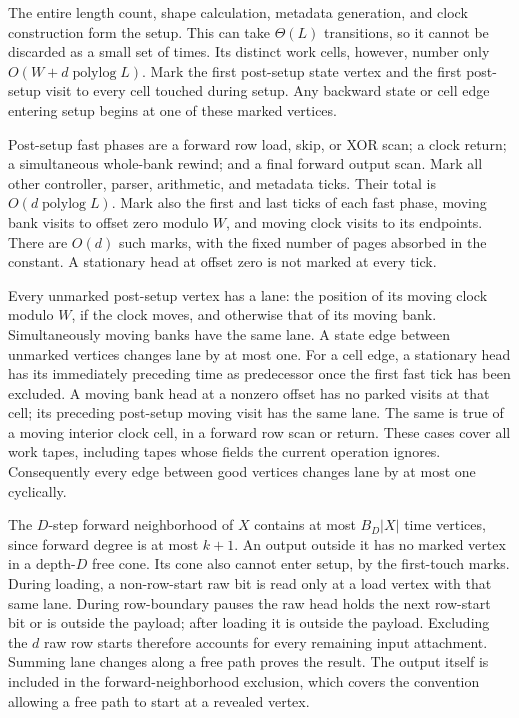 \begin{informalproof}
The entire length count, shape calculation, metadata generation, and clock
construction form the setup.  This can take $\Theta(L)$ transitions, so
it cannot be discarded as a small set of times.  Its distinct work cells,
however, number only $O(W+d\operatorname{polylog}L)$.  Mark the first
post-setup state vertex and the first post-setup visit to every cell touched
during setup.  Any backward state or cell edge entering setup begins at
one of these marked vertices.

Post-setup fast phases are a forward row load, skip, or XOR scan; a clock
return; a simultaneous whole-bank rewind; and a final forward output
scan.  Mark all other controller, parser, arithmetic, and metadata ticks.
Their total is $O(d\operatorname{polylog}L)$.  Mark also the first and last
ticks of each fast phase, moving bank visits to offset zero modulo $W$,
and moving clock visits to its endpoints.  There are $O(d)$ such marks,
with the fixed number of pages absorbed in the constant.  A stationary
head at offset zero is not marked at every tick.

Every unmarked post-setup vertex has a lane: the position of its moving
clock modulo $W$, if the clock moves, and otherwise that of its moving
bank.  Simultaneously moving banks have the same lane.  A state edge
between unmarked vertices changes lane by at most one.  For a cell edge,
a stationary head has its immediately preceding time as predecessor once
the first fast tick has been excluded.  A moving bank head at a nonzero
offset has no parked visits at that cell; its preceding post-setup moving
visit has the same lane.  The same is true of a moving interior clock
cell, in a forward row scan or return.  These cases cover all work tapes,
including tapes whose fields the current operation ignores.  Consequently
every edge between good vertices changes lane by at most one cyclically.

The $D$-step forward neighborhood of $X$ contains at most $B_D|X|$ time
vertices, since forward degree is at most $k+1$.  An output outside it
has no marked vertex in a depth-$D$ free cone.  Its cone also cannot enter
setup, by the first-touch marks.  During loading, a non-row-start raw bit
is read only at a load vertex with that same lane.  During row-boundary
pauses the raw head holds the next row-start bit or is outside the payload;
after loading it is outside the payload.  Excluding the $d$ raw row starts
therefore accounts for every remaining input attachment.  Summing lane
changes along a free path proves the result.  The output itself is included
in the forward-neighborhood exclusion, which covers the convention allowing
a free path to start at a revealed vertex.
\end{informalproof}

